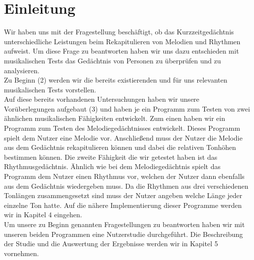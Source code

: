 \documentclass{acm_proc_article-sp}
\begin{document}
\section{Einleitung}
Wir haben uns mit der Fragestellung beschäftigt, ob das Kurzzeitgedächtnis unterschiedliche Leistungen beim Rekapitulieren von Melodien und Rhythmen aufweist. Um diese Frage zu beantworten haben wir uns dazu entschieden mit musikalischen Tests das Gedächtnis von Personen zu überprüfen und zu analysieren.\\
Zu Beginn (2) werden wir die bereits existierenden und für uns relevanten musikalischen Tests vorstellen.\\
Auf diese bereits vorhandenen Untersuchungen haben wir unsere Vorüberlegungen aufgebaut (3) und haben je ein Programm zum Testen von zwei ähnlichen musikalischen Fähigkeiten entwickelt. Zum einen haben wir ein Programm zum Testen des Melodiegedächtnisses entwickelt. Dieses Programm spielt dem Nutzer eine Melodie vor. Anschließend muss der Nutzer die Melodie aus dem Gedächtnis rekapitulieren können und dabei die relativen Tonhöhen bestimmen können.
Die zweite Fähigkeit die wir getestet haben ist das Rhythmusgedächtnis. Ähnlich wie bei dem Melodiegedächtnis spielt das Programm dem Nutzer einen Rhythmus vor, welchen der Nutzer dann ebenfalls aus dem Gedächtnis wiedergeben muss. Da die Rhythmen aus drei verschiedenen Tonlängen zusammengesetzt sind muss der Nutzer angeben welche Länge jeder einzelne Ton hatte. Auf die nähere Implementierung dieser Programme werden wir in Kapitel 4 eingehen.\\
Um unsere zu Beginn genannten Fragestellungen zu beantworten haben wir mit unseren beiden Programmen eine Nutzerstudie durchgeführt. Die Beschreibung der Studie und die Auswertung der Ergebnisse werden wir in Kapitel 5 vornehmen.
\end{document}

